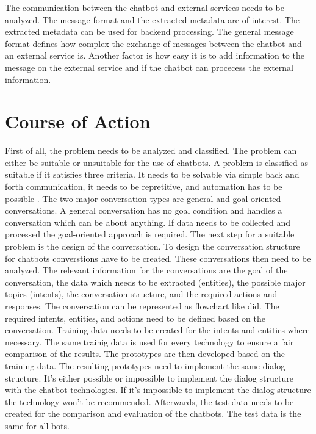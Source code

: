 





The communication between the chatbot and external services needs to be analyzed.
The message format and the extracted metadata are of interest.
The extracted metadata can be used for backend processing.
The general message format defines how complex the exchange of messages between the 
chatbot and an external service is.
Another factor is how easy it is to add information to the message on the 
external service and if the chatbot can procecess the external information.


\section{Course of Action} %
First of all, the problem needs to be analyzed and classified.
The problem can either be suitable or unsuitable for the use of chatbots.
A problem is classified as suitable if it satisfies three criteria. 
It needs to be solvable via simple back and forth communication,
it needs to be repretitive, and automation has to be possible \citet{singhbuilding}.
The two major conversation types are general and goal-oriented conversations.
A general conversation has no goal condition and handles a conversation which can be 
about anything. 
If data needs to be collected and processed the goal-oriented approach is required.
The next step for a suitable problem is the design of the conversation.
To design the conversation structure for chatbots converstions have to be created.
These conversations then need to be analyzed.
The relevant information for the conversations are the goal of the conversation, the 
data which needs to be extracted (entities), the possible major topics (intents), 
the conversation structure, and the required actions and responses.
The conversation can be represented as flowchart like \citet{singhbuilding} did.
The required intents, entities, and actions need to be defined based on the conversation.
Training data needs to be created for the intents and entities where necessary.
The same trainig data is used for every technology to ensure a fair 
comparison of the results.
The prototypes are then developed based on the training data.
The resulting prototypes need to implement the same dialog structure.
It's either possible or impossible to implement the dialog structure with the 
chatbot technologies. 
If it's impossible to implement the dialog structure the technology 
won't be recommended.
Afterwards, the test data needs to be created for the comparison and evaluation of 
the chatbots.
The test data is the same for all bots.

